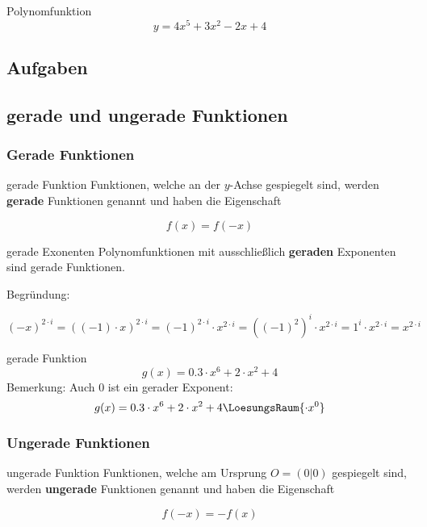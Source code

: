 \begin{beispiel}{Polynomfunktion}{}
  $$y=4x^5 + 3x^2 -2x + 4$$
\end{beispiel}


\subsection*{Aufgaben}

\newpage

\subsection{gerade und ungerade Funktionen}
\subsubsection{Gerade Funktionen}

\begin{definition}{gerade Funktion}{}
  Funktionen, welche an der $y$-Achse gespiegelt sind, werden
  \textbf{gerade} Funktionen genannt und haben die Eigenschaft

  $$f(x) = f(-x)$$
\end{definition}


\begin{gesetz}{gerade Exonenten}{}
  Polynomfunktionen mit ausschließlich \textbf{geraden} Exponenten sind gerade Funktionen.

  Begründung:

  $$(-x)^{2\cdot{}i} = ((-1)\cdot{}x)^{2\cdot{}i} = (-1)^{2\cdot{}i} \cdot{} x^{2\cdot{}i} = \left((-1)^2\right)^i \cdot{} x^{2\cdot{}i} = 1^i\cdot{}x^{2\cdot{}i} = x^{2\cdot{}i}$$
\end{gesetz}

\begin{beispiel}{gerade Funktion}{}
  $$g(x) = 0.3\cdot{}x^6 + 2\cdot{}x^2 + 4$$
  Bemerkung: Auch $0$ ist ein gerader Exponent:
  $$g(x) = 0.3\cdot{}x^6 + 2\cdot{}x^2 + 4\LoesungsRaum{\cdot{}x^0}$$  
\end{beispiel}
\newpage
\subsubsection{Ungerade Funktionen}
\begin{definition}{ungerade Funktion}{}
  Funktionen, welche am Ursprung $O = (0|0)$ gespiegelt sind, werden
  \textbf{ungerade} Funktionen genannt und haben die Eigenschaft

  $$f(-x) = -f(x)$$
\end{definition}




